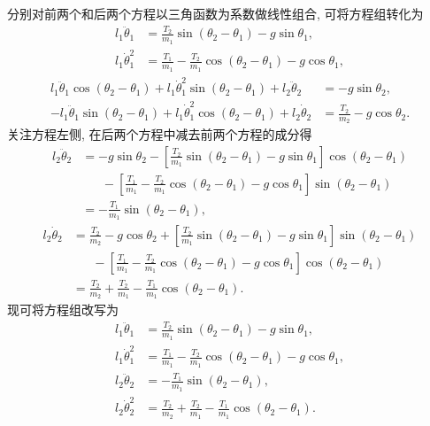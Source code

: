\begin{example}[双摆]
    分别对前两个和后两个方程以三角函数为系数做线性组合, 可将方程组转化为
    \begin{align*}
        l_1\ddot{\theta}_1 &= \frac{T_2}{m_1}\sin(\theta_2-\theta_1)-g\sin\theta_1,\\
        l_1\dot{\theta}_1^2 &= \frac{T_1}{m_1}-\frac{T_2}{m_1}\cos(\theta_2-\theta_1)-g\cos\theta_1,
    \end{align*}
    \vspace{-1.1cm}
    \begin{align*}
        l_1\ddot{\theta}_1\cos(\theta_2-\theta_1)+l_1\dot{\theta}_1^2\sin(\theta_2-\theta_1)+l_2\ddot{\theta}_2 &= -g\sin\theta_2,\\ 
        -l_1\ddot{\theta}_1\sin(\theta_2-\theta_1)+l_1\dot{\theta}_1^2\cos(\theta_2-\theta_1)+l_2\dot{\theta}_2 &= \frac{T_2}{m_2}-g\cos\theta_2.
    \end{align*}
    关注方程左侧, 在后两个方程中减去前两个方程的成分得
    \begin{align*}
        l_2\ddot{\theta}_2 &= -g\sin\theta_2-\left[ \frac{T_2}{m_1}\sin(\theta_2-\theta_1)-g\sin\theta_1 \right]\cos(\theta_2-\theta_1)\\ 
        &\phantom{=}\;-\left[ \frac{T_1}{m_1}-\frac{T_2}{m_1}\cos(\theta_2-\theta_1)-g\cos\theta_1 \right]\sin(\theta_2-\theta_1)\\ 
        &=-\frac{T_1}{m_1}\sin(\theta_2-\theta_1),
    \end{align*}
    \begin{align*}
        l_2\dot{\theta}_2 &= \frac{T_2}{m_2}-g\cos\theta_2 +\left[ \frac{T_2}{m_1}\sin(\theta_2-\theta_1)-g\sin\theta_1 \right]\sin(\theta_2-\theta_1)\\ 
        &\phantom{=}\;-\left[ \frac{T_1}{m_1}-\frac{T_2}{m_1}\cos(\theta_2-\theta_1)-g\cos\theta_1 \right]\cos(\theta_2-\theta_1)\\ 
        &=\frac{T_2}{m_2}+\frac{T_2}{m_1}-\frac{T_1}{m_1}\cos(\theta_2-\theta_1).
    \end{align*}
    现可将方程组改写为
    \begin{align*}
        l_1\ddot{\theta}_1 &= \frac{T_2}{m_1}\sin(\theta_2-\theta_1)-g\sin\theta_1,\\
        l_1\dot{\theta}_1^2 &= \frac{T_1}{m_1}-\frac{T_2}{m_1}\cos(\theta_2-\theta_1)-g\cos\theta_1,\\ 
        l_2\ddot{\theta}_2 &= -\frac{T_1}{m_1}\sin(\theta_2-\theta_1),\\ 
        l_2\dot{\theta}_2^2 &= \frac{T_2}{m_2}+\frac{T_2}{m_1}-\frac{T_1}{m_1}\cos(\theta_2-\theta_1).

\end{align*}
\end{example}
